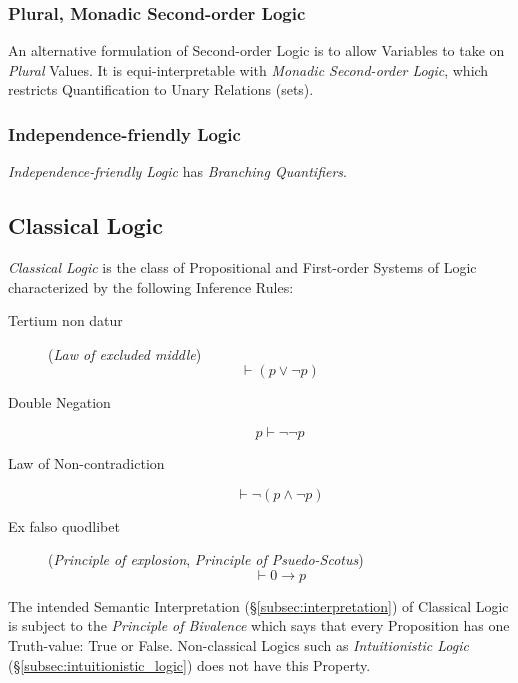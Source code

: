 \documentclass{article}
\begin{document}
\subsubsection{Plural, Monadic Second-order Logic}

An alternative formulation of Second-order Logic is to allow Variables
to take on \emph{Plural} Values. It is equi-interpretable with
\emph{Monadic Second-order Logic}, which restricts Quantification to
Unary Relations (sets).

\subsubsection{Independence-friendly Logic}\label{subsec:independence_logic}

\emph{Independence-friendly Logic} has \emph{Branching Quantifiers}.

\subsection{Classical Logic}\label{subsec:classical_logic}

\emph{Classical Logic} is the class of Propositional and
First-order Systems of Logic characterized by the following Inference
Rules:

\begin{description}

\item [Tertium non datur] (\emph{Law of excluded middle})
    \[\vdash(p \vee \neg p)\]

\item [Double Negation]
    \[p \vdash \neg\neg p\]

\item [Law of Non-contradiction]
    \[\vdash \neg(p \wedge \neg p)\]

\item [Ex falso quodlibet] (\emph{Principle of explosion},
  \emph{Principle of Psuedo-Scotus})
    \[\vdash 0 \rightarrow p\]


\end{description}

The intended Semantic Interpretation (\S\ref{subsec:interpretation})
of Classical Logic is subject to the \emph{Principle of Bivalence}
which says that every Proposition has one Truth-value: True or False.
Non-classical Logics such as \emph{Intuitionistic Logic}
(\S\ref{subsec:intuitionistic_logic}) does not have this Property.
\end{document}
